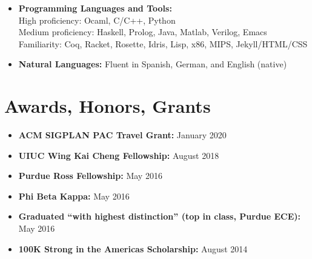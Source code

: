 \documentclass[12pt,a4paper,sans]{moderncv}        %
\begin{document}
\begin{itemize}

\item \textbf{Programming Languages and Tools:} \\
  High proficiency: Ocaml, C/C++, Python
  \\ Medium proficiency: Haskell, Prolog, Java, Matlab, Verilog, Emacs
  \\ Familiarity: Coq, Racket, Rosette, Idris, Lisp, x86, MIPS, Jekyll/HTML/CSS
\vspace{4pt}



\item \textbf{Natural Languages:} Fluent in Spanish, German, and English (native)

\vspace{4pt}


\end{itemize}

\section{Awards, Honors, Grants}

\vspace{4pt}

\begin{itemize}

\item \textbf{ACM SIGPLAN PAC Travel Grant:} January 2020
\vspace{4pt}
\item \textbf{UIUC Wing Kai Cheng Fellowship:} August 2018
\vspace{4pt}
\item \textbf{Purdue Ross Fellowship:} May 2016
\vspace{4pt}
\item \textbf{Phi Beta Kappa:} May 2016
\vspace{4pt}
\item \textbf{Graduated ``with highest distinction'' (top in class,
    Purdue ECE):} May 2016
\vspace{4pt}
\item \textbf{100K Strong in the Americas Scholarship:} August 2014

\end{itemize}
\end{document}
